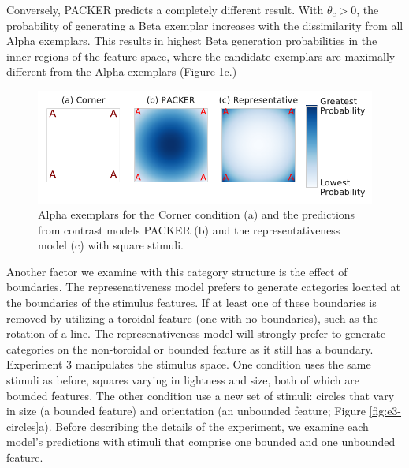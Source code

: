\documentclass[12pt]{article}
\begin{document}
\begin{flushleft}
Conversely, PACKER predicts a completely different result. With $\theta_c > 0$,
the probability of generating a Beta exemplar increases with the dissimilarity
from all Alpha exemplars. This results in highest Beta generation probabilities
in the inner regions of the feature space, where the candidate exemplars are
maximally different from the Alpha exemplars (Figure \ref{fig:e3-squares}c.)

\begin{figure}[p]
    \begin{center} 
      \includegraphics[width=.8\textwidth]{figs/e3-squares.pdf}
      \caption{Alpha exemplars for the Corner condition (a) and the predictions
        from contrast models PACKER (b) and the representativeness model (c)
        with square stimuli.}
      \label{fig:e3-squares}
    \end{center}
\end{figure}

Another factor we examine with this category structure is the effect of boundaries. The represenativeness model prefers to generate categories located
at the boundaries of the stimulus features. If at least one of these boundaries
is removed by utilizing a toroidal feature (one with no boundaries), such as the rotation of a line. The represenativeness model will strongly prefer to generate categories on the non-toroidal or bounded feature as it still has a boundary. Experiment 3 manipulates the stimulus space. One condition uses the same stimuli as before, squares varying in lightness and size, both of which are bounded features. The other condition use a new set of stimuli:
circles that vary in size (a bounded feature) and orientation (an
unbounded feature; Figure \ref{fig:e3-circles}a). Before describing the
details of the experiment, we examine each model's
predictions with stimuli that comprise one bounded and one unbounded feature.



\end{flushleft}
\end{document}
